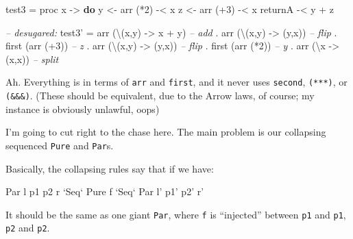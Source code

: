 \documentclass[]{article}
\newenvironment{Shaded}{\begin{snugshade}}{\end{snugshade}}
\newcommand{\CommentTok}[1]{\textcolor[rgb]{0.56,0.35,0.01}{\textit{#1}}}
\newcommand{\DataTypeTok}[1]{\textcolor[rgb]{0.13,0.29,0.53}{#1}}
\newcommand{\DecValTok}[1]{\textcolor[rgb]{0.00,0.00,0.81}{#1}}
\newcommand{\FunctionTok}[1]{\textcolor[rgb]{0.00,0.00,0.00}{#1}}
\newcommand{\KeywordTok}[1]{\textcolor[rgb]{0.13,0.29,0.53}{\textbf{#1}}}
\newcommand{\NormalTok}[1]{#1}
\newcommand{\OtherTok}[1]{\textcolor[rgb]{0.56,0.35,0.01}{#1}}
\begin{document}
\begin{Shaded}
\begin{Highlighting}[]
\NormalTok{test3 }\FunctionTok{=}\NormalTok{ proc x }\OtherTok{->} \KeywordTok{do}
\NormalTok{    y }\OtherTok{<-}\NormalTok{ arr (}\FunctionTok{*}\DecValTok{2}\NormalTok{) }\FunctionTok{-<}\NormalTok{ x}
\NormalTok{    z }\OtherTok{<-}\NormalTok{ arr (}\FunctionTok{+}\DecValTok{3}\NormalTok{) }\FunctionTok{-<}\NormalTok{ x}
\NormalTok{    returnA }\FunctionTok{-<}\NormalTok{ y }\FunctionTok{+}\NormalTok{ z}

\CommentTok{-- desugared:}
\NormalTok{test3' }\FunctionTok{=}\NormalTok{ arr (\textbackslash{}(x,y) }\OtherTok{->}\NormalTok{ x }\FunctionTok{+}\NormalTok{ y)     }\CommentTok{-- add}
       \FunctionTok{.}\NormalTok{ arr (\textbackslash{}(x,y) }\OtherTok{->}\NormalTok{ (y,x))     }\CommentTok{-- flip}
       \FunctionTok{.}\NormalTok{ first (arr (}\FunctionTok{+}\DecValTok{3}\NormalTok{))          }\CommentTok{-- z}
       \FunctionTok{.}\NormalTok{ arr (\textbackslash{}(x,y) }\OtherTok{->}\NormalTok{ (y,x))     }\CommentTok{-- flip}
       \FunctionTok{.}\NormalTok{ first (arr (}\FunctionTok{*}\DecValTok{2}\NormalTok{))          }\CommentTok{-- y}
       \FunctionTok{.}\NormalTok{ arr (\textbackslash{}x }\OtherTok{->}\NormalTok{ (x,x))         }\CommentTok{-- split}
\end{Highlighting}
\end{Shaded}

Ah. Everything is in terms of \texttt{arr} and \texttt{first}, and it never uses
\texttt{second}, \texttt{(***)}, or \texttt{(\&\&\&)}. (These should be
equivalent, due to the Arrow laws, of course; my instance is obviously unlawful,
oops)

I'm going to cut right to the chase here. The main problem is our collapsing
sequenced \texttt{Pure} and \texttt{Par}s.

Basically, the collapsing rules say that if we have:

\begin{Shaded}
\begin{Highlighting}[]
\DataTypeTok{Par}\NormalTok{ l p1 p2 r }\OtherTok{`Seq`} \DataTypeTok{Pure}\NormalTok{ f }\OtherTok{`Seq`} \DataTypeTok{Par}\NormalTok{ l' p1' p2' r'}
\end{Highlighting}
\end{Shaded}

It should be the same as one giant \texttt{Par}, where \texttt{f} is
``injected'' between \texttt{p1} and \texttt{p1\textquotesingle{}}, \texttt{p2}
and \texttt{p2\textquotesingle{}}.
\end{document}
